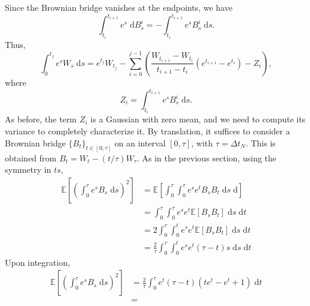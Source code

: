 \documentclass[reqno,12pt]{amsart}
\theoremstyle{plain}%
\theoremstyle{definition}
\begin{document}
Since the Brownian bridge vanishes at the endpoints, we have
\[
    \int_{t_i}^{t_{i+1}} e^s \;\mathrm{d}B_s^i = - \int_{t_i}^{t_{i+1}} e^s B_s^i\;\mathrm{d}s.
\]
Thus,
\begin{equation}
    \int_0^{t_j} e^s W_s \;\mathrm{d}s = e^{t_j}W_{t_j} - \sum_{i = 0}^{j-1} \left( \frac{W_{t_{i+1}} - W_{t_i}}{t_{i+1}-t_i}\left(e^{t_{i+1}} - e^{t_i}\right) - Z_i \right),
\end{equation}
where
\begin{equation}
    Z_i = \int_{t_i}^{t_{i+1}} e^s B_s^i\;\mathrm{d}s.
\end{equation}
As before, the term $Z_i$ is a Gaussian with zero mean, and we need to compute its variance to completely characterize it. By translation, it suffices to consider a Brownian bridge $\{B_t\}_{t\in [0, \tau]}$ on an interval $[0, \tau]$, with $\tau = \Delta t_N$. This is obtained from $B_t = W_t - (t/\tau)W_\tau$. As in the previous section, using the symmetry in $ts$,
\begin{align*}
    \mathbb{E}\left[\left(\int_0^{\tau} e^s B_s\;\mathrm{d}s\right)^2\right] & = \mathbb{E}\left[\int_0^{\tau} \int_0^\tau e^s e^t B_sB_t\;\mathrm{d}s\;\mathrm{d}\right] \\
    & = \int_0^\tau \int_0^\tau e^s e^t \mathbb{E}[B_sB_t] \;\mathrm{d}s\;\mathrm{d}t \\
    & = 2\int_0^\tau \int_0^t e^s e^t \mathbb{E}[B_sB_t] \;\mathrm{d}s\;\mathrm{d}t \\
    & = \frac{2}{\tau}\int_0^\tau \int_0^t e^s e^t (\tau - t) s \;\mathrm{d}s\;\mathrm{d}t
\end{align*}
Upon integration,
\begin{align*}
    \mathbb{E}\left[\left(\int_0^{\tau} e^s B_s\;\mathrm{d}s\right)^2\right] & = \frac{2}{\tau}\int_0^\tau e^t (\tau - t) (te^t - e^t + 1) \;\mathrm{d}t \\
    & = 
\end{align*}
\end{document}
